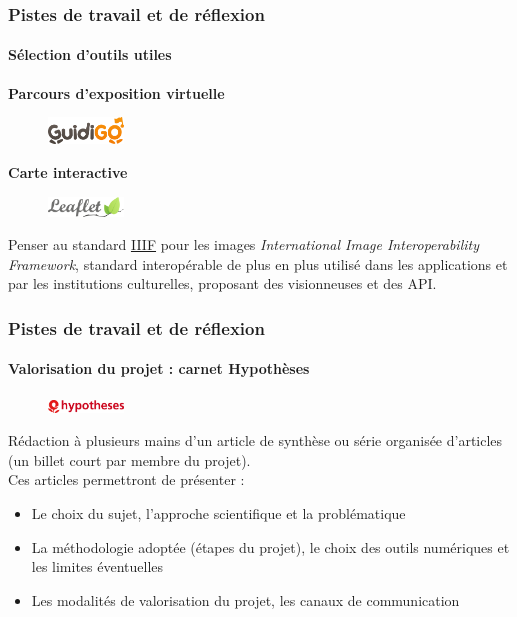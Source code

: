 \documentclass[xcolor=table]{beamer}
\begin{document}
\begin{frame}[plain]
\frametitle{Pistes de travail et de r\'eflexion}
\framesubtitle{S\'election d'outils utiles}
\textbf{Parcours d'exposition virtuelle}
\begin{figure}[!]
\includegraphics[width=2cm]{images/guidigo-logo.png}
\end{figure}
\textbf{Carte interactive}
\begin{figure}[!]
\includegraphics[width=2cm]{images/leaflet-logo.png}
\end{figure}
\begin{beamerboxesrounded}{Penser au standard \href{https://iiif.io/}{IIIF} pour les images}
\textit{International Image Interoperability Framework}, standard interop\'erable de plus en plus utilis\'e dans les applications et par les institutions culturelles, proposant des visionneuses et des API.
\end{beamerboxesrounded}
\end{frame}

\begin{frame}[plain]
\frametitle{Pistes de travail et de r\'eflexion}
\framesubtitle{Valorisation du projet : carnet Hypoth\`eses}
\begin{figure}[!]
\includegraphics[width=2cm]{images/hypotheses_logo.png}
\end{figure}
R\'edaction \`a plusieurs mains d'un article de synth\`ese ou s\'erie organis\'ee d'articles (un billet court par membre du projet).\\
\newline
Ces articles permettront de pr\'esenter :
\begin{itemize}
    \item Le choix du sujet, l'approche scientifique et la probl\'ematique
    \item La m\'ethodologie adopt\'ee (\'etapes du projet), le choix des outils num\'eriques et les limites \'eventuelles
    \item Les modalit\'es de valorisation du projet, les canaux de communication
\end{itemize}
\end{frame}
\end{document}
